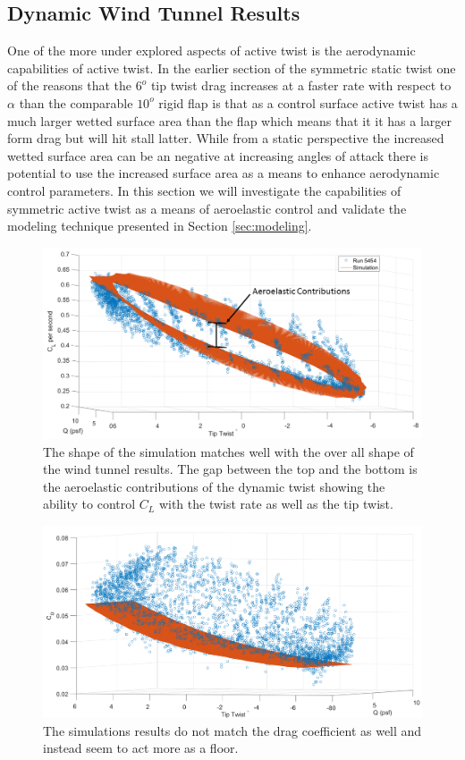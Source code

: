 \documentclass[11pt]{ucthesis}
\begin{document}
\subsection{Dynamic Wind Tunnel Results}

One of the more under explored aspects of active twist is the aerodynamic capabilities of active twist. In the earlier section of the symmetric static twist one of the reasons that the $6^o$ tip twist drag increases at a faster rate with respect to $\alpha$ than the comparable $10^o$ rigid flap is that as a control surface active twist has a much larger wetted surface area than the flap which means that it it has a larger form drag but will hit stall latter. While from a static perspective the increased wetted surface area can be an negative at increasing angles of attack there is potential to use the increased surface area as a means to enhance aerodynamic control parameters. In this section we will investigate the capabilities of symmetric active twist as a means of aeroelastic control and validate the modeling technique presented in Section \ref{sec:modeling}.

\begin{figure}[h]
\centering
\includegraphics[width=.75\linewidth]{Figures/Run5454CLAeroelastic.png}
\caption{The shape of the simulation matches well with the over all shape of the wind tunnel results. The gap between the top and the bottom is the aeroelastic contributions of the dynamic twist showing the ability to control $C_L$ with the twist rate as well as the tip twist.}
\label{fig:CLRun5454}
\end{figure}

\begin{figure}[h]
\centering
\includegraphics[width=.75\linewidth]{Figures/CD5454.png}
\caption{The simulations results do not match the drag coefficient as well and instead seem to act more as a floor.}
\label{fig:CDRun5454}
\end{figure}
\end{document}
